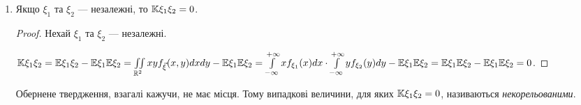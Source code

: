 \begin{enumerate}
\begin{proof}
\begin{enumerate}[label=\Roman*.]
            $\left|\K\xi_1\xi_2\right| \leq \sigma_{\xi_1} \sigma_{\xi_2}$.

            \item Введемо нормовані центровані випадкові величини $\xi_H = \frac{\xi - \E\xi}
            {\sigma_\xi}$, $\E\xi_H =0$, $\D\xi_H = 1$.

            $\E(\xi_{1H} \pm \xi_{2H})^2 \geq 0 \Leftrightarrow 
            \E(\xi^2_{1H}\pm2\xi_{1H}\xi_{2H}+\xi^2_{2H}) \geq 0 
            \Leftrightarrow 2 \pm 
            2\frac{\K\xi_1\xi_2}{\sigma_{\xi_1}\sigma_{\xi_2}} \geq 0 
            \Leftrightarrow $

            $\left|\K\xi_1\xi_2\right| \leq \sigma_{\xi_1} \sigma_{\xi_2}$.
        \end{enumerate}
    \end{proof}
    \item Якщо $\xi_1$ та $\xi_2$ --- незалежні, то $\mathbb{K}\xi_1\xi_2 = 0$.
    \begin{proof}
        Нехай $\xi_1$ та $\xi_2$ --- незалежні.

        $\mathbb{K}\xi_1\xi_2 = \mathbb{E}\xi_1\xi_2 - \mathbb{E}\xi_1\mathbb{E}\xi_2 = 
        \iint\limits_{\mathbb{R}^2} xy f_{\vec{\xi}}(x,y)dx dy 
        - \mathbb{E}\xi_1\mathbb{E}\xi_2
        = \int\limits_{-\infty}^{+\infty}xf_{\xi_1}(x)dx \cdot
        \int\limits_{-\infty}^{+\infty}yf_{\xi_2}(y)dy
        - \mathbb{E}\xi_1\mathbb{E}\xi_2 = 
        \mathbb{E}\xi_1\mathbb{E}\xi_2 - \mathbb{E}\xi_1\mathbb{E}\xi_2 = 0$.
    \end{proof}

    Обернене твердження, взагалі кажучи, не має місця. Тому випадкові 
    величини, для яких $\mathbb{K}\xi_1\xi_2 = 0$, називаються 
    \emph{некорельованими}.
\end{enumerate}


